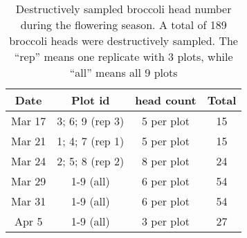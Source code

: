 \begin{table}[htb]
  \caption[Destructively sampled broccoli head number during the flowering season]{Destructively sampled broccoli head number during the flowering season. A total of 189 broccoli heads were destructively sampled. The ``rep'' means one replicate with 3 plots, while ``all'' means all 9 plots}
  \label{tbl:des2}
    \begin{center}
          \begin{tabular}{cccc}
          \hline
          \textbf{Date} & \textbf{Plot id} & \textbf{head count} & \textbf{Total} \\ \hline
          Mar 17        & 3; 6; 9 (rep 3)  & 5 per plot          & 15             \\
          Mar 21        & 1; 4; 7 (rep 1)  & 5 per plot          & 15             \\
          Mar 24        & 2; 5; 8 (rep 2)  & 8 per plot          & 24             \\
          Mar 29        & 1-9 (all)        & 6 per plot          & 54             \\
          Mar 31        & 1-9 (all)        & 6 per plot          & 54             \\
          Apr 5         & 1-9 (all)        & 3 per plot          & 27             \\ \hline
          \end{tabular}
    \end{center}
\end{table}